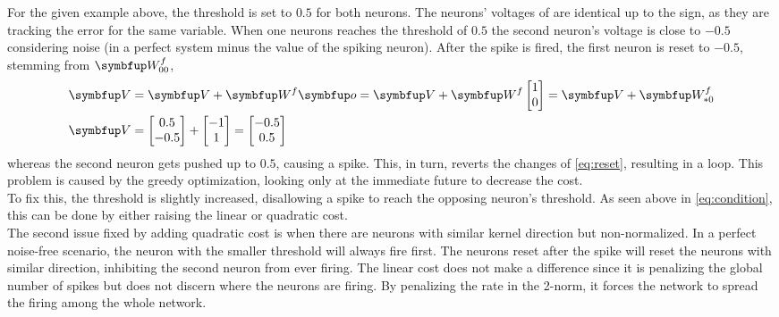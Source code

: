 For the given example above, the threshold is set to $0.5$ for both neurons. The neurons' voltages of are identical up to the sign, as they are tracking the error for the same variable. When one neurons reaches the threshold of $0.5$ the second neuron's voltage is close to $-0.5$ considering noise (in a perfect system minus the value of the spiking neuron). After the spike is fired, the first neuron is reset to $-0.5$, stemming from $\bmu{W}^f_{00}$,
\begin{equation}\label{eq:reset}
\begin{aligned}
\bmu{V} &= \bmu{V} + \bmu{W}^f\bmu{o} = \bmu{V} + \bmu{W}^f\begin{bmatrix}
1\\
0
\end{bmatrix} = \bmu{V} + \bmu{W}^f_{*0}\\
\bmu{V} &= \begin{bmatrix}
0.5\\
-0.5\\
\end{bmatrix} +
\begin{bmatrix}
-1\\
1\\
\end{bmatrix} =
\begin{bmatrix}
-0.5\\
0.5
\end{bmatrix}
\end{aligned}
\end{equation}
whereas the second neuron gets pushed up to $0.5$, causing a spike. This, in turn, reverts the changes of \cref{eq:reset}, resulting in a loop. This problem is caused by the greedy optimization, looking only at the immediate future to decrease the cost.\\
To fix this, the threshold is slightly increased, disallowing a spike to reach the opposing neuron's threshold. As seen above in \cref{eq:condition}, this can be done by either raising the linear or quadratic cost.\\
The second issue fixed by adding quadratic cost is when there are neurons with similar kernel direction but non-normalized. In a perfect noise-free scenario, the neuron with the smaller threshold will always fire first. The neurons reset after the spike will reset the neurons with similar direction, inhibiting the second neuron from ever firing. The linear cost does not make a difference since it is penalizing the global number of spikes but does not discern where the neurons are firing. By penalizing the rate in the 2-norm, it forces the network to spread the firing among the whole network.


